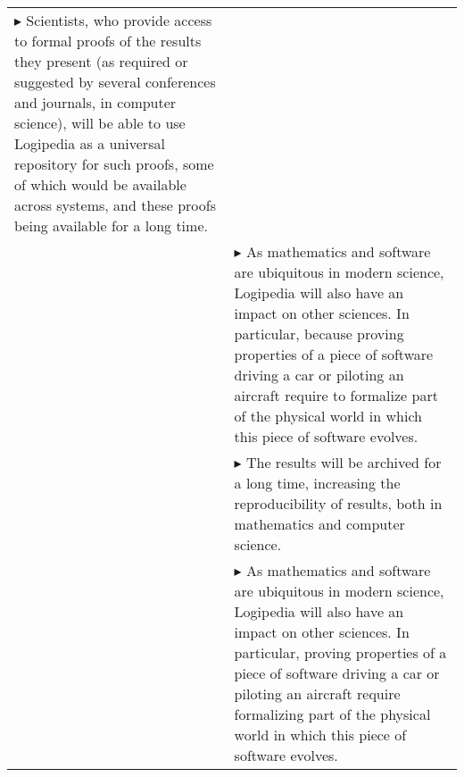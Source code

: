 \begin{longtable}{|p{}|p{}|}
$\blacktriangleright$ Scientists, who provide access
  to formal proofs of the results they present (as required or
  suggested by several conferences and journals, in computer science), 
  will be able to
  use Logipedia as a universal repository for such proofs, some of
  which would be available across systems, and these proofs being
  available for a long time.
\\
&
$\blacktriangleright$ As mathematics and software are ubiquitous in 
  modern science, Logipedia will also have an impact on other sciences. 
  In particular, because proving properties of a piece of software driving 
  a car or piloting an aircraft require to formalize part of the physical 
  world in which this piece of software evolves.
\\
& 
$\blacktriangleright$ The results will be archived for a long time, increasing the
  reproducibility of results, both in mathematics and computer science.
\\
&
$\blacktriangleright$ As mathematics and software are ubiquitous in modern science,
  Logipedia will also have an impact on other sciences. In
  particular, proving properties of a piece of software driving
  a car or piloting an aircraft require formalizing part of the
  physical world in which this piece of software evolves.


\end{longtable}
